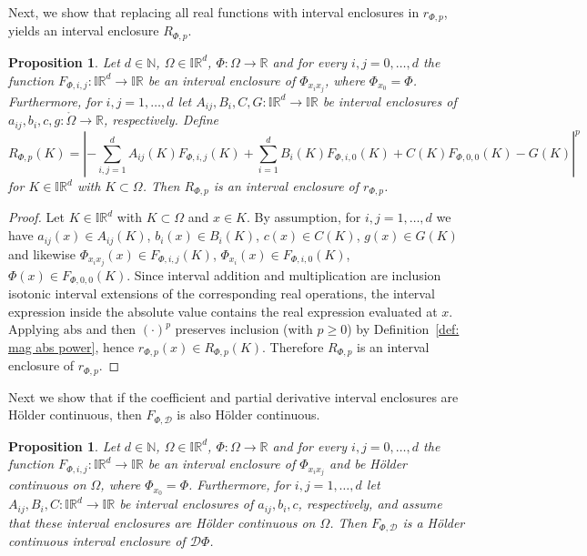 \documentclass[a4paper, 11pt]{article}
\newtheorem{proposition}[theorem]{Proposition}
\begin{document}
    Next, we show that replacing all real functions with interval enclosures in $r_{\Phi,p}$, yields an interval enclosure $R_{\Phi,p}$.
	
	\begin{proposition}\label{prop: energy interval enclosure}
		Let $d \in \mathbb{N}$, $\Omega \in \mathbb{IR}^d$, $\Phi: \Omega \to \mathbb{R}$ and for every $i,j=0,\dotsc,d$ the function $F_{\Phi, i,j} : \mathbb{IR}^d  \to \mathbb{IR}$ be an interval enclosure of $\Phi_{x_ix_j}$, where $\Phi_{x_0}=\Phi$. Furthermore, for $i,j=1,\dotsc, d$ let $A_{ij},B_i,C,G: \mathbb{IR}^d \to \mathbb{IR}$ be interval enclosures of $a_{ij},b_i,c,g: \mathring{\Omega} \to \mathbb{R}$, respectively. Define
		\begin{equation}
			R_{\Phi,p}(K) = \left|- \sum_{i,j=1}^d A_{ij}(K) F_{\Phi,i,j}(K)+ \sum_{i=1}^d B_i(K) F_{\Phi,i,0}(K) + C(K)F_{\Phi,0,0}(K) -G(K)\right|^p
		\end{equation}
		for $K\in \mathbb{IR}^d$ with $K \subset \Omega$. Then $R_{\Phi, p}$ is an interval enclosure of $r_{\Phi, p}$.
	\end{proposition}
    \begin{proof}
        Let $K \in \mathbb{IR}^d$ with $K\subset\Omega$ and $x \in K$. By assumption, for $i,j=1,\dotsc, d$ we have
        $a_{ij}(x)\in A_{ij}(K)$, $b_i(x) \in B_i(K)$, $c(x) \in C(K)$, $g(x) \in G(K)$ and likewise $\Phi_{x_i x_j}(x)\in F_{\Phi,i,j}(K)$, $\Phi_{x_i}(x) \in F_{\Phi,i,0}(K)$, $\Phi(x) \in F_{\Phi,0,0}(K)$.
        Since interval addition and multiplication are inclusion isotonic interval extensions of the corresponding real operations, the interval expression inside the absolute value contains the real expression evaluated at $x$. Applying $\mathrm{abs}$ and then $(\cdot)^p$ preserves inclusion (with $p\geq 0$) by Definition~\ref{def: mag abs power}, hence $r_{\Phi,p}(x)\in R_{\Phi,p}(K)$.
        Therefore $R_{\Phi,p}$ is an interval enclosure of $r_{\Phi,p}$.
    \end{proof}
	
	Next we show that if the coefficient and partial derivative interval enclosures are Hölder continuous, then $F_{\Phi,\mathcal{D}}$ is also Hölder continuous.
	
	\begin{proposition}\label{prop:DiffOpIntervalEnclosure}
		Let $d \in \mathbb{N}$, $\Omega \in \mathbb{IR}^d$, $\Phi: \Omega \to \mathbb{R}$ and for every $i,j=0,\dotsc,d$ the function $F_{\Phi, i,j} : \mathbb{IR}^d \to \mathbb{IR}$ be an interval enclosure of $\Phi_{x_ix_j}$ and be Hölder continuous on $\Omega$, where $\Phi_{x_0}=\Phi$. Furthermore, for $i,j=1,\dotsc, d$ let $A_{ij},B_i,C: \mathbb{IR}^d \to \mathbb{IR}$ be interval enclosures of $a_{ij},b_i,c$, respectively, and assume that these interval enclosures are Hölder continuous on $\Omega$. Then $F_{\Phi, \mathcal{D}}$ is a Hölder continuous interval enclosure of $\mathcal{D}\Phi$.
	\end{proposition}
	
\end{document}
